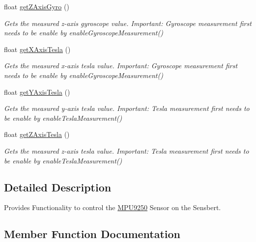 \begin{DoxyCompactItemize}
float \hyperlink{class_m_p_u9250_a27425b930342f7bc5aedb67c332d2904}{get\+Z\+Axis\+Gyro} ()
\begin{DoxyCompactList}\small\item\em Gets the measured z-\/axis gyroscope value. Important\+: Gyroscope measurement first needs to be enable by enable\+Gyroscope\+Measurement() \end{DoxyCompactList}\item 
float \hyperlink{class_m_p_u9250_a357bb8db0c965bb2078b3831e89a68da}{get\+X\+Axis\+Tesla} ()
\begin{DoxyCompactList}\small\item\em Gets the measured x-\/axis tesla value. Important\+: Gyroscope measurement first needs to be enable by enable\+Gyroscope\+Measurement() \end{DoxyCompactList}\item 
float \hyperlink{class_m_p_u9250_ac190cacabcf8c57bd1b739f5ac327221}{get\+Y\+Axis\+Tesla} ()
\begin{DoxyCompactList}\small\item\em Gets the measured y-\/axis tesla value. Important\+: Tesla measurement first needs to be enable by enable\+Tesla\+Measurement() \end{DoxyCompactList}\item 
float \hyperlink{class_m_p_u9250_a688d0d30e9d5292997ad60938b3da431}{get\+Z\+Axis\+Tesla} ()
\begin{DoxyCompactList}\small\item\em Gets the measured z-\/axis tesla value. Important\+: Tesla measurement first needs to be enable by enable\+Tesla\+Measurement() \end{DoxyCompactList}\end{DoxyCompactItemize}


\subsection{Detailed Description}
Provides Functionality to control the \hyperlink{class_m_p_u9250}{M\+P\+U9250} Sensor on the Sensbert. 

\subsection{Member Function Documentation}
\hypertarget{class_m_p_u9250_a78a8d5b88d5c8d2f166c8ae12f6f65c7}{}
